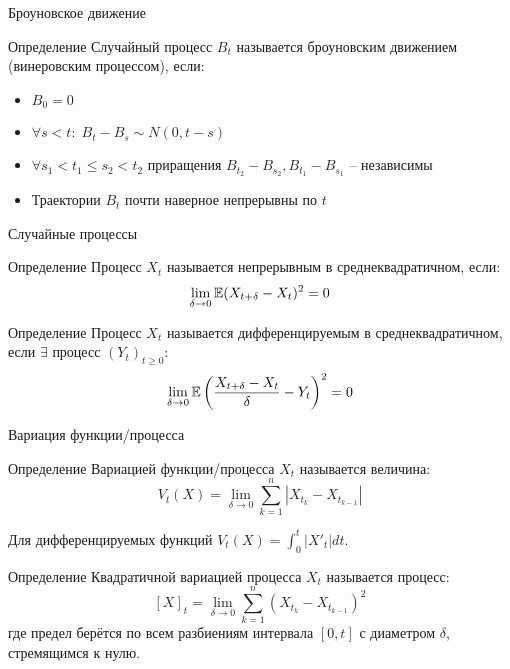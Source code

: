 \documentclass{beamer}
\begin{document}
\begin{frame}{Броуновское движение}
    \begin{block}{Определение}
        Случайный процесс $B_t$ называется броуновским движением (винеровским процессом), если:
        \begin{itemize}
            \item $B_0 = 0$
            \item $\forall s < t: \; B_t - B_s \sim N(0, t - s)$
            \item $\forall s_1 < t_1 \leq s_2 < t_2$ приращения
            $B_{t_2} - B_{s_2}, B_{t_1} - B_{s_1}$ -- независимы
            \item Траектории $B_t$ почти наверное непрерывны по $t$ 
        \end{itemize}
    \end{block}
\end{frame}
\begin{frame}{Случайные процессы}
    \begin{block}{Определение}
        Процесс $X_t$ называется непрерывным в среднеквадратичном, если:
        $$
            \lim_{\delta \to 0} \mathbb{E}(X_{t+\delta} - X_t)^2 = 0
        $$
    \end{block}
    \begin{block}{Определение}
        Процесс $X_t$ называется дифференцируемым в среднеквадратичном, если $\exists$ процесс $(Y_t)_{t\geq 0}$:
        $$
            \lim_{\delta \to 0} \mathbb{E} \left(\dfrac{X_{t+\delta} - X_t}{\delta} - Y_t\right)^2 = 0
        $$
    \end{block}
\end{frame}

\begin{frame}{Вариация функции/процесса}
    \begin{block}{Определение}
        Вариацией функции/процесса $X_t$ называется величина:
        $$
            V_t(X) = \lim_{\delta \to 0} \sum_{k=1}^n |X_{t_k} - X_{t_{k-1}}|
        $$
    \end{block} Для дифференцируемых функций $V_t(X)=\int_0^t |X'_t|dt$. 
    \begin{block}{Определение}
        Квадратичной вариацией процесса $X_t$ называется процесс:
        $$
            [X]_t = \lim_{\delta \to 0} \sum_{k=1}^n (X_{t_k} - X_{t_{k-1}})^2
        $$где предел берётся по всем разбиениям интервала $[0, t]$ с диаметром $\delta$, стремящимся к нулю.
    \end{block}
\end{frame}
\end{document}
